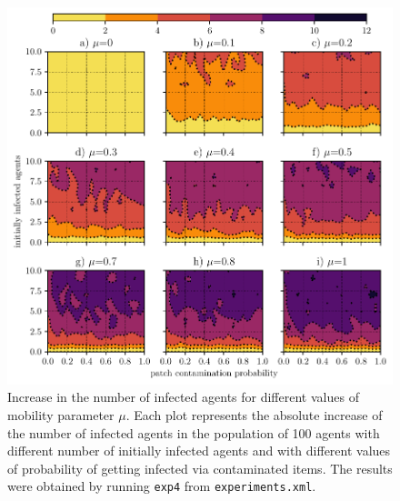\documentclass[11pt,a4paper]{article}
\begin{document}
\begin{figure}[ht!]
\includegraphics{plots/plot_exp5.pdf}
\caption{Increase in the number of infected agents for different values of mobility parameter $\mu$. Each plot represents the absolute increase of the number of infected agents in the population of 100 agents with different number of initially infected agents and with different values of probability of getting infected via contaminated items. The results were obtained by running \texttt{exp4} from \texttt{experiments.xml}.}
\end{figure}
\end{document}
